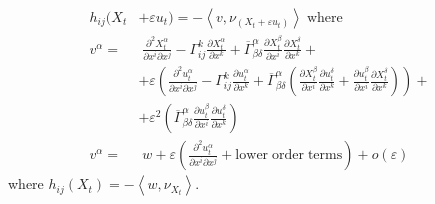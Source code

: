 \begin{align*}
	h_{ij}(X_t& + \varepsilon u_t )=-\left\langle v, \nu_{(X_t+\varepsilon u_t)}\right\rangle\; \mathrm{where}\\
	v^\alpha=&\; \frac{\partial^2 X_t^\alpha}{\partial x^i \partial x^j} - \Gamma^k_{ij}\frac{\partial X_t^\alpha}{\partial x^k}+\overline{\Gamma}^\alpha_{\beta \delta}\frac{\partial X_t^\beta}{\partial x^i}\frac{\partial X_t^\delta}{\partial x^k} +\\ %
	&+\varepsilon\left(\frac{\partial^2 u_t^\alpha}{\partial x^i \partial x^j} - \Gamma^k_{ij}\frac{\partial u_t^\alpha}{\partial x^k}+\overline{\Gamma}^\alpha_{\beta \delta}\left(\frac{\partial X_t^\beta}{\partial x^i}\frac{\partial u_t^\delta}{\partial x^k} + \frac{\partial u_t^\beta}{\partial x^i}\frac{\partial X_t^\delta}{\partial x^k}\right)\right)+\\
	&+\varepsilon^2\left(\overline{\Gamma}^\alpha_{\beta \delta}\frac{\partial u_t^\beta}{\partial x^i}\frac{\partial u_t^\delta}{\partial x^k}\right) \\
	v^\alpha=&\; w +\varepsilon\left(\frac{\partial^2 u_t^\alpha}{\partial x^i \partial x^j} + \mathrm{lower \; order \;  terms}\right) + o(\varepsilon)
\end{align*}
where $h_{ij}(X_t)=-\left\langle w, \nu_{X_t}\right\rangle$.

